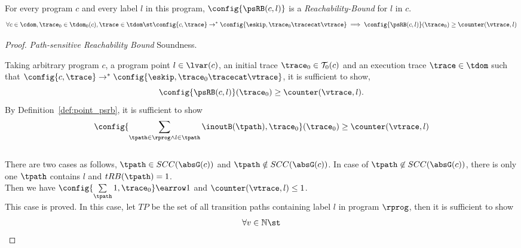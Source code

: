 \begin{theorem}
For every program ${c}$ and every label $l$ in this program,
$\config{\psRB(c, l)}$ is a \emph{Reachability-Bound} for $l$ in $c$.
\[
  \forall c \in \cdom, \trace_0 \in \tdom_0(c), \trace \in \tdom \st 
  \config{{c}, \trace} \to^{*} \config{\eskip, \trace_0 \tracecat \vtrace} 
  \implies \config{\psRB(c, l)}(\trace_0) \geq \counter(\vtrace, l) 
  \]
\end{theorem}
  \begin{proof} \emph{Path-sensitive Reachability Bound} Soundness.

  Taking arbitrary program $c$, a program point $l \in \lvar(c)$, an initial trace $\trace_0 \in \mathcal{T}_0(c)$ and an execution trace $\trace \in \tdom$
  such that $\config{{c}, \trace} \to^{*} \config{\eskip, \trace_0 \tracecat \vtrace}$,
  it is sufficient to show,
%
\[
  \config{\psRB(c, l)}(\trace_0) \geq \counter(\vtrace, l) .
\]
By Definition~\ref{def:point_psrb}, it is sufficient to show 
        \[
          \config{\sum\limits_{\tpath \in \rprog \land 
          l \in \tpath} \inoutB(\tpath), \trace_0
          }(\trace_0)  \geq  \counter(\vtrace, l)\]
          \\
          There are two cases as follows,
        $\tpath \in SCC(\absG(c))$ and $\tpath \notin SCC(\absG(c))$.
          In case of  $\tpath \not\in SCC(\absG(c))$, there is only one $\tpath$ contains $l$ and $tRB(\tpath) = 1$.
          \\
          Then we have $\config{\sum\limits_{\tpath} 1, \trace_0
          } \earrow 1$ and $ \counter(\vtrace, l) \leq 1$.
          \\
          This case is proved.
          In this case, let $TP$ be the set of all transition paths containing 
          label $l$ in program $\rprog$, then it is sufficient to show 
          \[
          \forall v \in \mathbb{N} \st 
\]
\end{proof}
